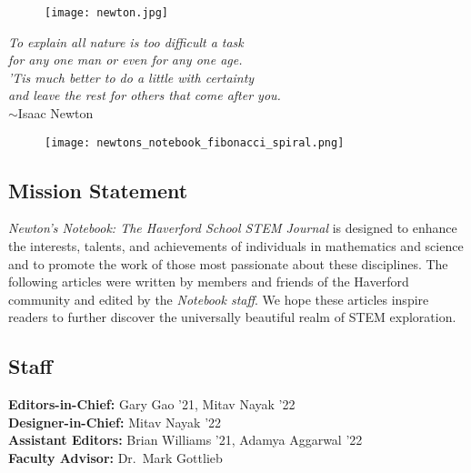 \documentclass[12pt]{article}
\theoremstyle{definition}
\begin{document}
\setcounter{tocdepth}{1}



\begin{figure}[H]
    \centering \texttt{[image: newton.jpg]}
\end{figure}

\begin{center}
    \textit{To explain all nature is too difficult a task\\
    for any one man or even for any one age.\\
    'Tis much better to do a little with certainty\\
    and leave the rest for others that come after you.}\\
    	$\sim$Isaac Newton
\end{center}

\newpage
\begin{spacing}{1}
\tableofcontents
\end{spacing}

\begin{figure}[H]
    \centering
    \vspace*{75pt}
    \texttt{[image: newtons\_notebook\_fibonacci\_spiral.png]}
\end{figure}

\newpage
\subsection*{Mission Statement}
\textit{Newton’s Notebook: The Haverford School STEM Journal} is designed to enhance the interests, talents, and achievements of individuals in mathematics and science and to promote the work of those most passionate about these disciplines. The following articles were written by members and friends of the Haverford community and edited by the \textit{Notebook staff}. We hope these articles inspire readers to further discover the universally beautiful realm of STEM exploration. 
\subsection*{Staff}
{\centering{}
    \textbf{Editors-in-Chief:} Gary Gao '21, Mitav Nayak '22
    \\
    \textbf{Designer-in-Chief:} Mitav Nayak '22
    \\ 
    \textbf{Assistant Editors:} Brian Williams '21, Adamya Aggarwal '22
    \\
    \textbf{Faculty Advisor:} Dr.\ Mark Gottlieb
    \\}
\end{document}
